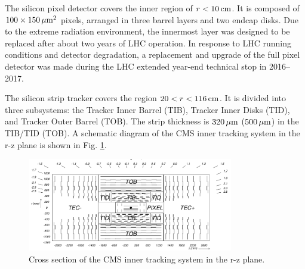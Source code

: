 The silicon pixel detector covers the inner region of $r < 10 \,\text{cm}$. It is composed of $100 \times 150 \,\mu\text{m}^{2}$ pixels, arranged in three barrel layers and two endcap disks. Due to the extreme 
radiation environment, the innermost layer was designed to be replaced after about two years of LHC operation. 
In response to LHC running conditions and detector degradation, a replacement and upgrade of the full pixel detector was made during the LHC extended year-end technical stop in 2016--2017. 

The silicon strip tracker covers the region $20 < r < 116 \,\text{cm}$. It is divided into three subsystems: the Tracker Inner Barrel (TIB), Tracker Inner Disks (TID), and Tracker Outer Barrel (TOB). 
The strip thickness is $320 \,\mu\text{m}$ ($500 \,\mu\text{m}$) in the TIB/TID (TOB). A schematic diagram of the CMS inner tracking system in the r-z plane is shown in Fig. \ref{fig:cms_tracker}.

\begin{figure}[tb]
  \centering
   \includegraphics[width=0.8\textwidth]{fig/experiment/detector/cms_tracker.png}
	\caption[Cross section of the CMS inner tracking system in the r-z plane.]{Cross section of the CMS inner tracking system in the r-z plane.~\cite{CMS:2008xjf}}
	\label{fig:cms_tracker}
\end{figure}


